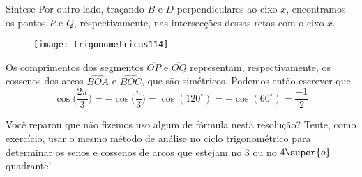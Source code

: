 \begin{example}{Síntese}
Por outro lado, traçando $B$ e $D$ perpendiculares ao eixo $x$, encontramos os pontos $P$ e $Q$, respectivamente, nas intersecções dessas retas com o eixo $x$.

\begin{figure}[H]
\centering

\texttt{[image: trigonometricas114]}
\end{figure}

Os comprimentos dos segmentos $\overline{OP}$ e $\overline{OQ}$ representam, respectivamente, os cossenos dos arcos $\widehat{BOA}$ e $\widehat{BOC}$, que são simétricos. Podemos então escrever que
\begin{equation*}
\cos\bigg(\frac{2\pi}{3}\bigg)=-\cos\bigg(\frac{\pi}{3}\bigg)=\cos(120^{\circ})=-\cos(60^{\circ})=\frac{-1}{2}
\end{equation*}

\end{example}

Você reparou que não fizemos uso algum de fórmula nesta resolução? Tente, como exercício, usar o mesmo método de análise no ciclo trigonométrico para determinar os senos e cossenos de arcos que estejam no $3$ ou no $4\super{o}$ quadrante!


